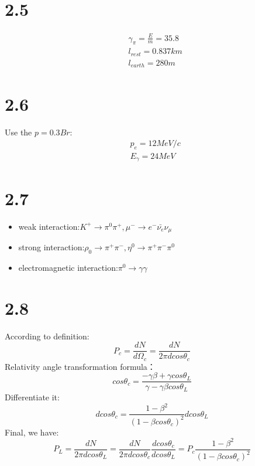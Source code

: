 \documentclass{article}
\begin{document}
\begin{CJK*}{GBK}{song}
\section{2.5}
\begin{equation}
\begin{aligned}
&\gamma_{\pi}=\frac{E}{m}=35.8\\
&l_{rest}=0.837km\\
&l_{earth}=280m
\end{aligned}
\end{equation}

\section{2.6}
Use the $p=0.3Br$:
\begin{equation}
\begin{aligned}
&p_e=12MeV/c\\
&E_{\gamma}=24MeV
\end{aligned}
\end{equation}


\section{2.7}

\begin{itemize}
\item weak interaction:$K^+\rightarrow\pi^0\pi^+,  \mu^-\rightarrow e^-\bar{\nu_e}\nu_{\mu}$
\item strong interaction:$\rho_0\rightarrow\pi^+\pi^-, \eta^0\rightarrow \pi^+\pi^-\pi^0$
\item electromagnetic interaction:$\pi^0\rightarrow\gamma\gamma$
\end{itemize}

\section{2.8}
According to definition:
\begin{equation}
P_c=\frac{dN}{d\Omega_c}=\frac{dN}{2\pi dcos\theta_c}
\end{equation}
Relativity angle transformation formula：
\begin{equation}
cos\theta_c=\frac{-\gamma\beta+\gamma cos\theta_L}{\gamma-\gamma\beta cos\theta_L}
\end{equation}
Differentiate it:
\begin{equation}
dcos\theta_c=\frac{1-\beta^2}{(1-\beta cos\theta_c)^2}dcos\theta_L
\end{equation}
Final, we have:
\begin{equation}
P_L=\frac{dN}{2\pi dcos\theta_L}=\frac{dN}{2\pi dcos\theta_c}\frac{dcos\theta_c}{dcos\theta_L}=P_c\frac{1-\beta^2}{(1-\beta cos\theta_c)^2}
\end{equation}


\end{CJK*}
\end{document}
